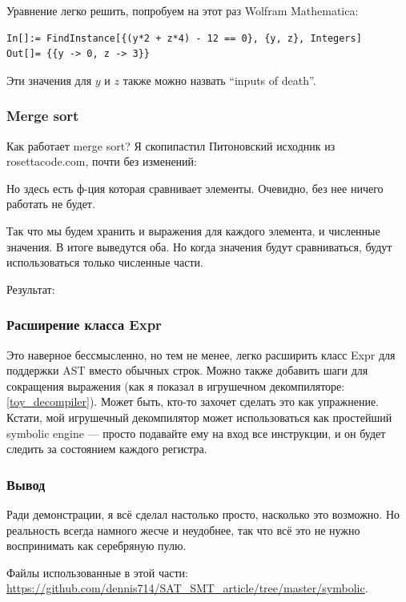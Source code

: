 Уравнение легко решить, попробуем на этот раз Wolfram Mathematica:

\begin{lstlisting}
In[]:= FindInstance[{(y*2 + z*4) - 12 == 0}, {y, z}, Integers]
Out[]= {{y -> 0, z -> 3}}
\end{lstlisting}

Эти значения для $y$ и $z$ также можно назвать ``inputs of death''.

\subsubsection{Merge sort}

Как работает merge sort?
Я скопипастил Питоновский исходник из rosettacode.com, почти без изменений:



Но здесь есть ф-ция которая сравнивает элементы.
Очевидно, без нее ничего работать не будет.

Так что мы будем хранить и выражения для каждого элемента, и численные значения.
В итоге выведутся оба.
Но когда значения будут сравниваться, будут использоваться только численные части.

Результат:



\subsubsection{Расширение класса Expr}

Это наверное бессмысленно, но тем не менее, легко расширить класс Expr для поддержки \ac{AST} вместо обычных строк.
Можно также добавить шаги для сокращения выражения (как я показал в игрушечном декомпиляторе: \ref{toy_decompiler}).
Может быть, кто-то захочет сделать это как упражнение.
Кстати, мой игрушечный декомпилятор может использоваться как простейший symbolic engine --- просто подавайте ему на вход
все инструкции, и он будет следить за состоянием каждого регистра.

\subsubsection{Вывод}

Ради демонстрации, я всё сделал настолько просто, насколько это возможно.
Но реальность всегда намного жесче и неудобнее, так что всё это не нужно воспринимать как серебряную пулю.

Файлы использованные в этой части: \url{https://github.com/dennis714/SAT_SMT_article/tree/master/symbolic}.

